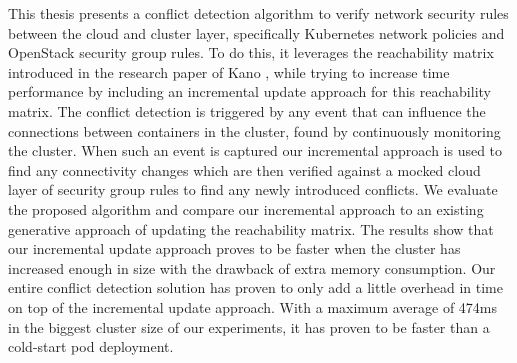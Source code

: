 This thesis presents a conflict detection algorithm to verify network security rules between the cloud and cluster layer, specifically Kubernetes network policies and OpenStack security group rules. To do this, it leverages the reachability matrix introduced in the research paper of Kano \cite{kano}, while trying to increase time performance by including an incremental update approach for this reachability matrix. The conflict detection is triggered by any event that can influence the connections between containers in the cluster, found by continuously monitoring the cluster. When such an event is captured our incremental approach is used to find any connectivity changes which are then verified against a mocked cloud layer of security group rules to find any newly introduced conflicts. We evaluate the proposed algorithm and compare our incremental approach to an existing generative approach of updating the reachability matrix. The results show that our incremental update approach proves to be faster when the cluster has increased enough in size with the drawback of extra memory consumption. Our entire conflict detection solution has proven to only add a little overhead in time on top of the incremental update approach. With a maximum average of 474ms in the biggest cluster size of our experiments, it has proven to be faster than a cold-start pod deployment.
\cleardoublepage
